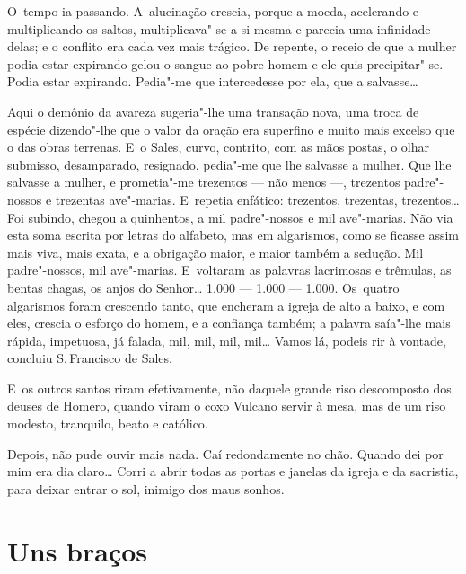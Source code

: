 \begin{linenumbers}
O~tempo ia passando. A~alucinação crescia, porque a moeda, acelerando e
multiplicando os saltos, multiplicava"-se a si mesma e parecia uma
infinidade delas; e o conflito era cada vez mais trágico. De repente, o
receio de que a mulher podia estar expirando gelou o sangue ao pobre
homem e ele quis precipitar"-se. Podia estar expirando. Pedia"-me que
intercedesse por ela, que a salvasse\ldots{}

Aqui o demônio da avareza sugeria"-lhe uma transação nova, uma troca de
espécie dizendo"-lhe que o valor da oração era superfino e muito mais
excelso que o das obras terrenas. E~o Sales, curvo, contrito, com as
mãos postas, o olhar submisso, desamparado, resignado, pedia"-me que lhe
salvasse a mulher. Que lhe salvasse a mulher, e prometia"-me trezentos ---
não menos ---, trezentos padre"-nossos e trezentas ave"-marias. E~repetia
enfático: trezentos, trezentas, trezentos\ldots{} Foi subindo, chegou a
quinhentos, a mil padre"-nossos e mil ave"-marias. Não via esta soma
escrita por letras do alfabeto, mas em algarismos, como se ficasse assim
mais viva, mais exata, e a obrigação maior, e maior também a sedução.
Mil padre"-nossos, mil ave"-marias. E~voltaram as palavras lacrimosas e
trêmulas, as bentas chagas, os anjos do Senhor\ldots{} 1.000 --- 1.000 ---
1.000. Os~quatro algarismos foram crescendo tanto, que encheram a igreja
de alto a baixo, e com eles, crescia o esforço do homem, e a confiança
também; a palavra saía"-lhe mais rápida, impetuosa, já falada, mil, mil,
mil, mil\ldots{} Vamos lá, podeis rir à vontade, concluiu S.\,Francisco de
Sales.

E~os outros santos riram efetivamente, não daquele grande riso
descomposto dos deuses de Homero, quando viram o coxo Vulcano servir à
mesa, mas de um riso modesto, tranquilo, beato e católico.

Depois, não pude ouvir mais nada. Caí redondamente no chão. Quando dei
por mim era dia claro\ldots{} Corri a abrir todas as portas e janelas da
igreja e da sacristia, para deixar entrar o sol, inimigo dos maus
sonhos.

\end{linenumbers}

\chapter{Uns braços}

